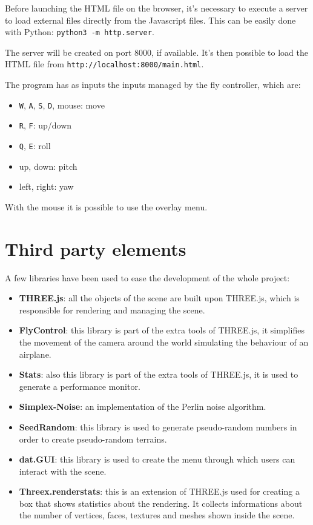 \documentclass[paper=a4, fontsize=11pt]{scrartcl} %
\numberwithin{equation}{section} %
\numberwithin{figure}{section} %
\numberwithin{table}{section} %
\theoremstyle{definition}
\begin{document}
Before launching the HTML file on the browser, it's necessary to execute a
server to load external files directly from the Javascript files. This can be
easily done with Python: \texttt{python3 -m http.server}.

The server will be created on port 8000, if available. It's then possible
to load the HTML file from \texttt{http://localhost:8000/main.html}.

The program has as inputs the inputs managed by the fly controller, which are:

\begin{itemize}
	\item \texttt{W}, \texttt{A}, \texttt{S}, \texttt{D}, mouse: move
	\item \texttt{R}, \texttt{F}: up/down
	\item \texttt{Q}, \texttt{E}: roll
	\item up, down: pitch
	\item left, right: yaw
\end{itemize}

With the mouse it is possible to use the overlay menu.


\section{Third party elements}

A few libraries have been used to ease the development of the whole project:

\begin{itemize}
	\item \textbf{THREE.js}: all the objects of the scene are built upon
		THREE.js, which is responsible for rendering and managing the scene.
	\item \textbf{FlyControl}: this library is part of the extra tools of
		THREE.js, it simplifies the movement of the camera around the world
		simulating the behaviour of an airplane.
	\item \textbf{Stats}: also this library is part of the extra tools of
		THREE.js, it is used to generate a performance monitor.
	\item \textbf{Simplex-Noise}: an implementation of the Perlin noise
		algorithm.
	\item \textbf{SeedRandom}: this library is used to generate pseudo-random
		numbers in order to create pseudo-random terrains.
	\item \textbf{dat.GUI}: this library is used to create the menu through which users can
		interact with the scene.
	\item \textbf{Threex.renderstats}: this is an extension of THREE.js used for creating a box 
		that shows statistics about the rendering. It collects informations about the number 
		of vertices, faces, textures and meshes shown inside the scene.
\end{itemize}
\end{document}
